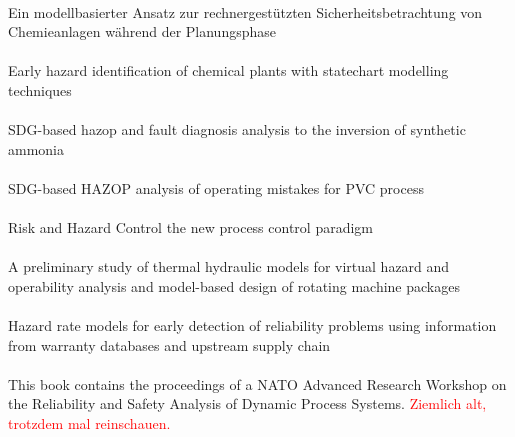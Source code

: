 \paragraph*{\cite{Graf_2000}} Ein modellbasierter Ansatz zur rechnergest{\"u}tzten Sicherheitsbetrachtung von Chemieanlagen w{\"a}hrend der Planungsphase

\paragraph*{\cite{Graf_2000a}} Early hazard identification of chemical plants with statechart modelling techniques

\paragraph*{\cite{Lu_2007}} {SDG}-based hazop and fault diagnosis analysis to the inversion of synthetic ammonia

\paragraph*{\cite{Wang_2009}} {SDG}-based {HAZOP} analysis of operating mistakes for {PVC} process

\paragraph*{\cite{Florea_2014}} Risk and Hazard Control the new process control paradigm

\paragraph*{\cite{Conti_2013}} A preliminary study of thermal hydraulic models for virtual hazard and operability analysis and model-based design of rotating machine packages

\paragraph*{\cite{Zhou_2012}} Hazard rate models for early detection of reliability problems using information from warranty databases and upstream supply chain

\paragraph*{\cite{Aldemir_1994}} This book contains the proceedings of a NATO Advanced Research Workshop on the Reliability and Safety Analysis of Dynamic Process Systems. \hfill \newline
\textcolor{red}{Ziemlich alt, trotzdem mal reinschauen.}

